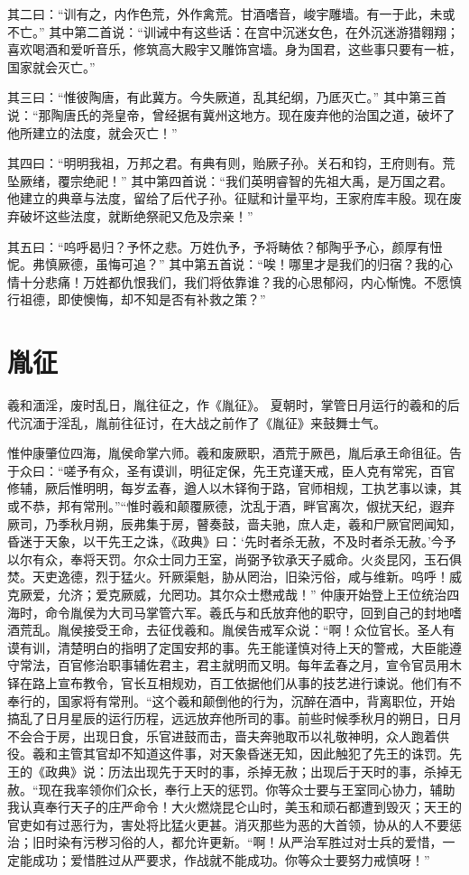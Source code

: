 \documentclass[a4paper,12pt,UTF8,twoside]{ctexbook}
\begin{document}
其二曰：“训有之，内作色荒，外作禽荒。甘酒嗜音，峻宇雕墙。有一于此，未或不亡。”
其中第二首说：“训诫中有这些话：在宫中沉迷女色，在外沉迷游猎翱翔；喜欢喝酒和爱听音乐，修筑高大殿宇又雕饰宫墙。身为国君，这些事只要有一桩，国家就会灭亡。”

其三曰：“惟彼陶唐，有此冀方。今失厥道，乱其纪纲，乃厎灭亡。”
其中第三首说：“那陶唐氏的尧皇帝，曾经据有冀州这地方。现在废弃他的治国之道，破坏了他所建立的法度，就会灭亡！”

其四曰：“明明我祖，万邦之君。有典有则，贻厥子孙。关石和钧，王府则有。荒坠厥绪，覆宗绝祀！”
其中第四首说：“我们英明睿智的先祖大禹，是万国之君。他建立的典章与法度，留给了后代子孙。征赋和计量平均，王家府库丰殷。现在废弃破坏这些法度，就断绝祭祀又危及宗亲！”

其五曰：“呜呼曷归？予怀之悲。万姓仇予，予将畴依？郁陶乎予心，颜厚有忸怩。弗慎厥德，虽悔可追？”
其中第五首说：“唉！哪里才是我们的归宿？我的心情十分悲痛！万姓都仇恨我们，我们将依靠谁？我的心思郁闷，内心惭愧。不愿慎行祖德，即使懊悔，却不知是否有补救之策？”

\chapter{胤征}

羲和湎淫，废时乱日，胤往征之，作《胤征》。
夏朝时，掌管日月运行的羲和的后代沉湎于淫乱，胤前往征讨，在大战之前作了《胤征》来鼓舞士气。

惟仲康肇位四海，胤侯命掌六师。羲和废厥职，酒荒于厥邑，胤后承王命徂征。告于众曰：“嗟予有众，圣有谟训，明征定保，先王克谨天戒，臣人克有常宪，百官修辅，厥后惟明明，每岁孟春，遒人以木铎徇于路，官师相规，工执艺事以谏，其或不恭，邦有常刑。”“惟时羲和颠覆厥德，沈乱于酒，畔官离次，俶扰天纪，遐弃厥司，乃季秋月朔，辰弗集于房，瞽奏鼓，啬夫驰，庶人走，羲和尸厥官罔闻知，昏迷于天象，以干先王之诛，《政典》曰：‘先时者杀无赦，不及时者杀无赦。’今予以尔有众，奉将天罚。尔众士同力王室，尚弼予钦承天子威命。火炎昆冈，玉石俱焚。天吏逸德，烈于猛火。歼厥渠魁，胁从罔治，旧染污俗，咸与维新。呜呼！威克厥爱，允济；爱克厥威，允罔功。其尔众士懋戒哉！”
仲康开始登上王位统治四海时，命令胤侯为大司马掌管六军。羲氏与和氏放弃他的职守，回到自己的封地嗜酒荒乱。胤侯接受王命，去征伐羲和。胤侯告戒军众说：“啊！众位官长。圣人有谟有训，清楚明白的指明了定国安邦的事。先王能谨慎对待上天的警戒，大臣能遵守常法，百官修治职事辅佐君主，君主就明而又明。每年孟春之月，宣令官员用木铎在路上宣布教令，官长互相规劝，百工依据他们从事的技艺进行谏说。他们有不奉行的，国家将有常刑。“这个羲和颠倒他的行为，沉醉在酒中，背离职位，开始搞乱了日月星辰的运行历程，远远放弃他所司的事。前些时候季秋月的朔日，日月不会合于房，出现日食，乐官进鼓而击，啬夫奔驰取币以礼敬神明，众人跑着供役。羲和主管其官却不知道这件事，对天象昏迷无知，因此触犯了先王的诛罚。先王的《政典》说：历法出现先于天时的事，杀掉无赦；出现后于天时的事，杀掉无赦。“现在我率领你们众长，奉行上天的惩罚。你等众士要与王室同心协力，辅助我认真奉行天子的庄严命令！大火燃烧昆仑山时，美玉和顽石都遭到毁灭；天王的官吏如有过恶行为，害处将比猛火更甚。消灭那些为恶的大首领，协从的人不要惩治；旧时染有污秽习俗的人，都允许更新。“啊！从严治军胜过对士兵的爱惜，一定能成功；爱惜胜过从严要求，作战就不能成功。你等众士要努力戒慎呀！”
\end{document}

